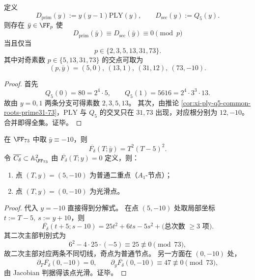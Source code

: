 \begin{theorem}[二级退化除子与主分支除子的交叉素数全集]\label{thm:xi-dprim-dsec-intersection-primes}
定义
\[
D_{\mathrm{prim}}(y):=y(y-1)\mathrm{PLY}(y),
\qquad
D_{\mathrm{sec}}(y):=Q_5(y).
\]
则存在 \(\bar y\in\FF_p\) 使
\[
D_{\mathrm{prim}}(\bar y)\equiv D_{\mathrm{sec}}(\bar y)\equiv 0\pmod p
\]
当且仅当
\[
p\in\{2,3,5,13,31,73\}.
\]
其中对奇素数 \(p\in\{5,13,31,73\}\) 的交点可取为
\[
(p,\bar y)=(5,0),\ (13,1),\ (31,12),\ (73,-10).
\]
\end{theorem}
\begin{proof}
首先
\[
Q_5(0)=80=2^4\cdot 5,\qquad
Q_5(1)=5616=2^4\cdot 3^3\cdot 13.
\]
故由 \(y=0,1\) 两条分支可得素数 \(2,3,5,13\)。
其次，由推论 \ref{cor:xi-ply-q5-common-roots-prime31-73}，\(\mathrm{PLY}\) 与 \(Q_5\) 的交叉只在 \(31,73\) 出现，对应根分别为 \(12,-10\)。
合并即得全集。证毕。
\end{proof}

\begin{theorem}\label{thm:xi-fdelta-char73-transverse-node}
在 \(\FF_{73}\) 中取 \(\bar y\equiv -10\)，则
\[
\overline{F_\delta}(T;\bar y)=T^2(T-5)^2.
\]
令 \(\overline{C_\delta}\subset\mathbb A^2_{\FF_{73}}\) 由 \(\overline{F_\delta}(T;y)=0\) 定义，则：
\begin{enumerate}
  \item 点 \((T,y)=(5,-10)\) 为普通二重点（\(A_1\)-节点）；
  \item 点 \((T,y)=(0,-10)\) 为光滑点。
\end{enumerate}
\end{theorem}
\begin{proof}
代入 \(y=-10\) 直接得到分解式。
在点 \((5,-10)\) 处取局部坐标 \(t:=T-5,\ s:=y+10\)，则
\[
\overline{F_\delta}(t+5;s-10)
=25t^2+6ts-5s^2+\text{(总次数 }\ge 3\text{ 项)}.
\]
其二次主部判别式为
\[
6^2-4\cdot 25\cdot(-5)\equiv 25\not\equiv 0\pmod{73},
\]
故二次主部对应两条不同切线，奇点为普通节点。
另一方面在 \((0,-10)\) 处，
\[
\partial_T\overline{F_\delta}(0,-10)=0,\qquad
\partial_y\overline{F_\delta}(0,-10)\equiv 47\not\equiv 0\pmod{73},
\]
由 Jacobian 判据得该点光滑。证毕。
\end{proof}

